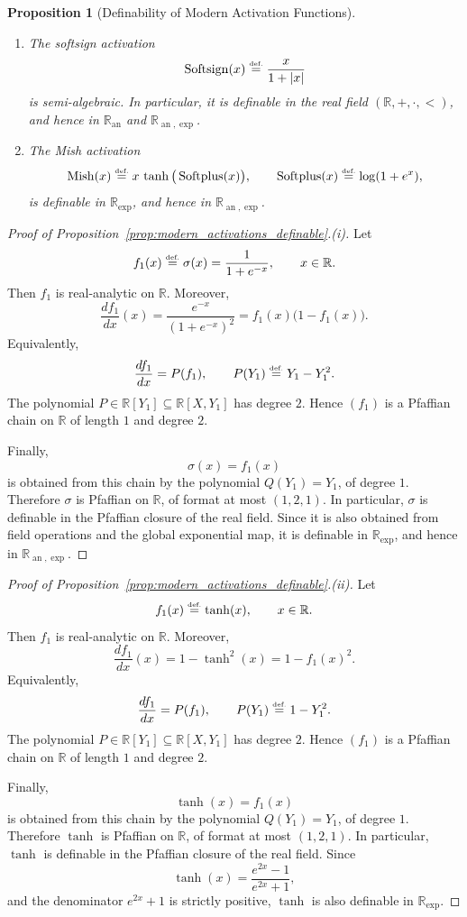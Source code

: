 \documentclass{article}
\newcommand{\eqdef}{\ensuremath{\stackrel{\mbox{\upshape\tiny def.}}{=}}}
\theoremstyle{plain}
\newtheorem{proposition}[theorem]{Proposition}
\theoremstyle{definition}
\theoremstyle{remark}
\theoremstyle{plain}
\numberwithin{thm}{section}
\theoremstyle{definition}
\numberwithin{equation}{section}
\begin{document}
\begin{proposition}[Definability of Modern Activation Functions]
\begin{enumerate}
    \item[(ix)] The softsign activation
\[
    \operatorname{Softsign}(x)
    \eqdef
    \frac{x}{1+|x|}
\]
is semi-algebraic. In particular, it is definable in the real field
\((\mathbb{R},+,\cdot,<)\), and hence in
\(\mathbb{R}_{\operatorname{an}}\) and
\(\mathbb{R}_{\operatorname{an},\exp}\).

    \item[(x)] The Mish activation
\[
    \operatorname{Mish}(x)
    \eqdef
    x\,\tanh\big(\operatorname{Softplus}(x)\big),
    \qquad
    \operatorname{Softplus}(x)\eqdef \log(1+e^x),
\]
is definable in \(\mathbb{R}_{\exp}\), and hence in
\(\mathbb{R}_{\operatorname{an},\exp}\).
\end{enumerate}
\end{proposition}

\begin{proof}[{Proof of Proposition~\ref{prop:modern_activations_definable}.(i)}]
Let
\[
    f_1(x)\eqdef \sigma(x)=\frac{1}{1+e^{-x}},
    \qquad x\in\mathbb{R}.
\]
Then \(f_1\) is real-analytic on \(\mathbb{R}\). Moreover,
\[
    \frac{d f_1}{dx}(x)
    =
    \frac{e^{-x}}{(1+e^{-x})^2}
    =
    f_1(x)\bigl(1-f_1(x)\bigr).
\]
Equivalently,
\[
    \frac{d f_1}{dx}
    =
    P(f_1),
    \qquad
    P(Y_1)\eqdef Y_1-Y_1^2.
\]
The polynomial \(P\in\mathbb{R}[Y_1]\subseteq\mathbb{R}[X,Y_1]\) has degree \(2\).
Hence \((f_1)\) is a Pfaffian chain on \(\mathbb{R}\) of length \(1\) and degree \(2\).

Finally,
\[
    \sigma(x)=f_1(x)
\]
is obtained from this chain by the polynomial \(Q(Y_1)=Y_1\), of degree \(1\).
Therefore \(\sigma\) is Pfaffian on \(\mathbb{R}\), of format at most \((1,2,1)\).
In particular, \(\sigma\) is definable in the Pfaffian closure of the real field.
Since it is also obtained from field operations and the global exponential map, it is
definable in \(\mathbb{R}_{\exp}\), and hence in \(\mathbb{R}_{\operatorname{an},\exp}\).
\end{proof}

\begin{proof}[{Proof of Proposition~\ref{prop:modern_activations_definable}.(ii)}]
Let
\[
    f_1(x)\eqdef \tanh(x),
    \qquad x\in\mathbb{R}.
\]
Then \(f_1\) is real-analytic on \(\mathbb{R}\). Moreover,
\[
    \frac{d f_1}{dx}(x)
    =
    1-\tanh^2(x)
    =
    1-f_1(x)^2.
\]
Equivalently,
\[
    \frac{d f_1}{dx}
    =
    P(f_1),
    \qquad
    P(Y_1)\eqdef 1-Y_1^2.
\]
The polynomial \(P\in\mathbb{R}[Y_1]\subseteq\mathbb{R}[X,Y_1]\) has degree
\(2\). Hence \((f_1)\) is a Pfaffian chain on \(\mathbb{R}\) of length \(1\)
and degree \(2\).

Finally,
\[
    \tanh(x)=f_1(x)
\]
is obtained from this chain by the polynomial \(Q(Y_1)=Y_1\), of degree \(1\).
Therefore \(\tanh\) is Pfaffian on \(\mathbb{R}\), of format at most
\((1,2,1)\). In particular, \(\tanh\) is definable in the Pfaffian closure of
the real field. Since
\[
    \tanh(x)=\frac{e^{2x}-1}{e^{2x}+1},
\]
and the denominator \(e^{2x}+1\) is strictly positive, \(\tanh\) is also
definable in \(\mathbb{R}_{\exp}\).
\end{proof}
\end{document}
